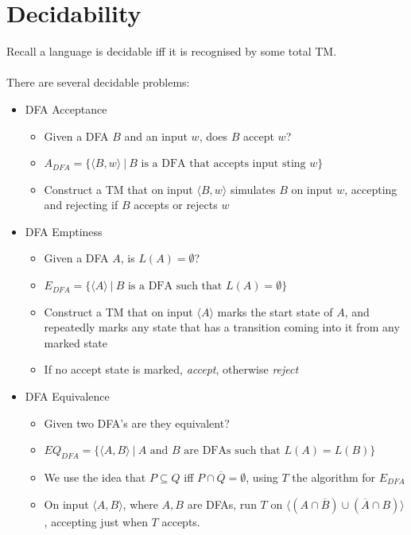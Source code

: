 \documentclass{article}
\newcommand{\encode}[1]{\langle #1 \rangle}
\begin{document}
    \section{Decidability}
    Recall a language is decidable iff it is recognised by some total TM. \\ \\
    There are several decidable problems:
    \begin{itemize}
        \item DFA Acceptance
            \begin{itemize}
                \item Given a DFA $B$ and an input $w$, does $B$ accept $w$?
                \item $A_{DFA} = \{ \encode{B,w} \ | \ B \text{ is a DFA that accepts input sting $w$} \}$
                \item Construct a TM that on input $\encode{B,w}$ simulates $B$ on input $w$, accepting and rejecting if $B$ accepts or rejects $w$
            \end{itemize}
        \item DFA Emptiness
            \begin{itemize}
                \item Given a DFA $A$, is $L(A) = \emptyset$?
                \item $E_{DFA} = \{ \encode{A} \ | \ B \text{ is a DFA such that $L(A) = \emptyset$} \}$
                \item Construct a TM that on input $\encode{A}$ marks the start state of $A$, and repeatedly marks any state that has a transition coming into it from any marked state
                \item If no accept state is marked, \textit{accept}, otherwise \textit{reject}
            \end{itemize}
        \item DFA Equivalence
            \begin{itemize}
                \item Given two DFA's are they equivalent?
                \item $EQ_{DFA} = \{ \encode{A, B} \ | \ \text{$A$ and $B$ are DFAs such that $L(A) = L(B)$} \}$
                \item We use the idea that $P \subseteq Q$ iff $P \cap \overline{Q} = \emptyset$, using $T$ the algorithm for $E_{DFA}$
                \item On input $\encode{A,B}$, where $A,B$ are DFAs, run $T$ on $\encode{ (A \cap \overline{B}) \cup (\overline{A} \cap B) }$, accepting just when $T$ accepts. 

\end{itemize}
\end{itemize}
\end{document}
